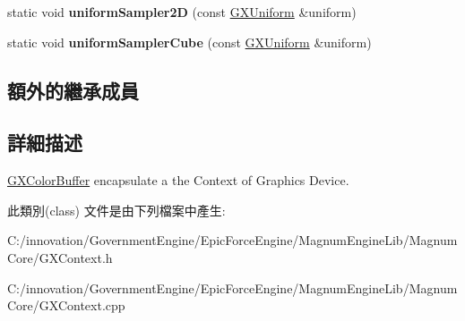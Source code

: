 \begin{DoxyCompactItemize}
\item 
static void {\bfseries uniform\+Sampler2D} (const \hyperlink{class_i_dream_sky_1_1_g_x_uniform}{G\+X\+Uniform} \&uniform)\hypertarget{class_i_dream_sky_1_1_g_x_context_a469f733edc6c6e19385e0cd73cbc31bd}{}\label{class_i_dream_sky_1_1_g_x_context_a469f733edc6c6e19385e0cd73cbc31bd}

\item 
static void {\bfseries uniform\+Sampler\+Cube} (const \hyperlink{class_i_dream_sky_1_1_g_x_uniform}{G\+X\+Uniform} \&uniform)\hypertarget{class_i_dream_sky_1_1_g_x_context_ace4ad56a57645ae31a86857da560cfe2}{}\label{class_i_dream_sky_1_1_g_x_context_ace4ad56a57645ae31a86857da560cfe2}

\end{DoxyCompactItemize}
\subsection*{額外的繼承成員}


\subsection{詳細描述}
\hyperlink{class_i_dream_sky_1_1_g_x_color_buffer}{G\+X\+Color\+Buffer} encapsulate a the Context of Graphics Device. 

此類別(class) 文件是由下列檔案中產生\+:\begin{DoxyCompactItemize}
\item 
C\+:/innovation/\+Government\+Engine/\+Epic\+Force\+Engine/\+Magnum\+Engine\+Lib/\+Magnum\+Core/G\+X\+Context.\+h\item 
C\+:/innovation/\+Government\+Engine/\+Epic\+Force\+Engine/\+Magnum\+Engine\+Lib/\+Magnum\+Core/G\+X\+Context.\+cpp\end{DoxyCompactItemize}
